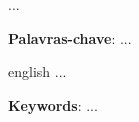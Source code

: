 
\setlength{\absparsep}{18pt} %
\begin{resumo}
 ...

 \textbf{Palavras-chave}: ...
\end{resumo}

\begin{resumo}[Abstract]
 \begin{otherlanguage*}{english}
   ...

   \vspace{\onelineskip}
 
   \noindent 
   \textbf{Keywords}: ...
 \end{otherlanguage*}
\end{resumo}